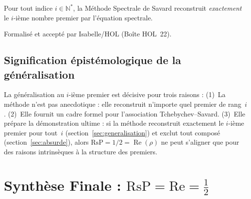 \documentclass[]{pasj02}
\begin{document}
\begin{corollary}
  Pour tout indice $i \in \mathbb{N}^*$, la Méthode Spectrale de Savard
  reconstruit \emph{exactement} le $i$-ième nombre premier par l'équation
  spectrale.
\end{corollary}

\noindent Formalisé et accepté par Isabelle/HOL (Boîte HOL~22).

\subsection{Signification épistémologique de la généralisation}
\label{ssec:signification}

La généralisation au $i$-ième premier est décisive pour trois raisons :
(1)~La méthode n'est pas anecdotique : elle reconstruit n'importe quel
premier de rang~$i$.
(2)~Elle fournit un cadre formel pour l'association Tchebychev--Savard.
(3)~Elle prépare la démonstration ultime : si la méthode reconstruit
exactement le $i$-ième premier pour tout~$i$ (section~\ref{sec:generalisation})
et exclut tout composé (section~\ref{sec:absurde}), alors
$\mathrm{RsP} = 1/2 = \operatorname{Re}(\rho)$ ne peut s'aligner que pour
des raisons intrinsèques à la structure des premiers.

\section{Synthèse Finale : $\mathrm{RsP} = \mathrm{Re} = \tfrac{1}{2}$}
\label{sec:synthese}
\end{document}
